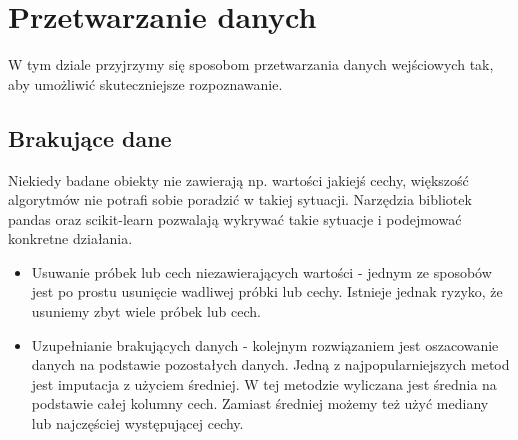 \documentclass[printmode, eng, openany]{mgr}
\newcommand\tab[1][1cm]{\hspace*{#1}}
\begin{document}
\section{Przetwarzanie danych}
\tab W tym dziale przyjrzymy się sposobom przetwarzania danych wejściowych tak, aby umożliwić skuteczniejsze rozpoznawanie.
\subsection{Brakujące dane}
\tab Niekiedy badane obiekty nie zawierają np. wartości jakiejś cechy, większość algorytmów nie potrafi sobie poradzić w takiej sytuacji. Narzędzia bibliotek pandas oraz scikit-learn pozwalają wykrywać takie sytuacje i podejmować konkretne działania.
\begin{itemize}
\item Usuwanie próbek lub cech niezawierających wartości - jednym ze sposobów jest po prostu usunięcie wadliwej próbki lub cechy. Istnieje jednak ryzyko, że usuniemy zbyt wiele próbek lub cech.
\item Uzupełnianie brakujących danych - kolejnym rozwiązaniem jest oszacowanie danych na podstawie pozostałych danych. Jedną z najpopularniejszych metod jest imputacja z użyciem średniej. W tej metodzie wyliczana jest średnia na podstawie całej kolumny cech. Zamiast średniej możemy też użyć mediany lub najczęściej występującej cechy.
\end{itemize}
\end{document}
